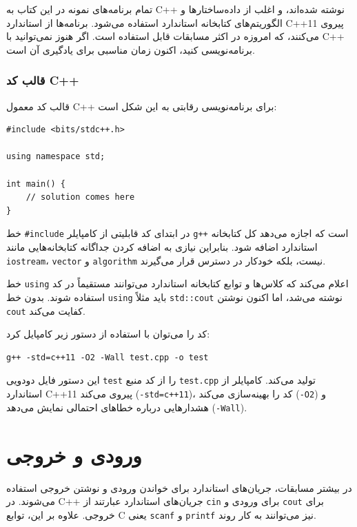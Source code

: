 تمام برنامه‌های نمونه در این کتاب به C++ نوشته شده‌اند،
و اغلب از داده‌ساختارها و الگوریتم‌های کتابخانه
استاندارد استفاده می‌شود.
برنامه‌ها از استاندارد C++11 پیروی می‌کنند،
که امروزه در اکثر مسابقات قابل استفاده است.
اگر هنوز نمی‌توانید با C++ برنامه‌نویسی کنید،
اکنون زمان مناسبی برای یادگیری آن است.

\subsubsection{قالب کد C++}

قالب کد معمول C++ برای برنامه‌نویسی رقابتی
به این شکل است:

\begin{lstlisting}
#include <bits/stdc++.h>

using namespace std;

int main() {
    // solution comes here
}
\end{lstlisting}

خط \texttt{\#include} در ابتدای کد قابلیتی از کامپایلر \texttt{g++} است که اجازه می‌دهد کل کتابخانه استاندارد اضافه شود. بنابراین نیازی به اضافه کردن جداگانه کتابخانه‌هایی مانند \texttt{iostream}، \texttt{vector} و \texttt{algorithm} نیست، بلکه خودکار در دسترس قرار می‌گیرند.

خط \texttt{using} اعلام می‌کند که کلاس‌ها و توابع کتابخانه استاندارد می‌توانند مستقیماً در کد استفاده شوند. بدون خط \texttt{using} باید مثلاً \texttt{std::cout} نوشته می‌شد، اما اکنون نوشتن \texttt{cout} کفایت می‌کند.

کد را می‌توان با استفاده از دستور زیر کامپایل کرد:

\begin{lstlisting}
g++ -std=c++11 -O2 -Wall test.cpp -o test
\end{lstlisting}

این دستور فایل دودویی \texttt{test} را از کد منبع \texttt{test.cpp} تولید می‌کند. کامپایلر از استاندارد C++11 پیروی می‌کند (\texttt{-std=c++11})، کد را بهینه‌سازی می‌کند (\texttt{-O2}) و هشدارهایی درباره خطاهای احتمالی نمایش می‌دهد (\texttt{-Wall}).

\section{ورودی و خروجی}


در بیشتر مسابقات، جریان‌های استاندارد برای خواندن ورودی و نوشتن خروجی استفاده می‌شوند. در C++ جریان‌های استاندارد عبارتند از \texttt{cin} برای ورودی و \texttt{cout} برای خروجی. علاوه بر این، توابع C یعنی \texttt{scanf} و \texttt{printf} نیز می‌توانند به کار روند.

